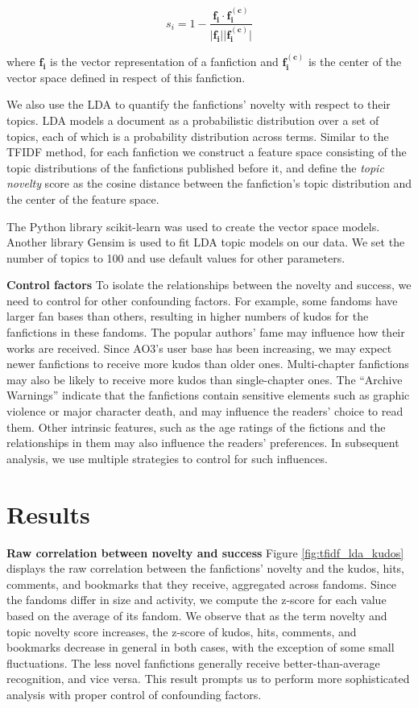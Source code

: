 \documentclass[letterpaper]{article} %
\begin{document}
\begin{equation}
s_i = 1-\frac{\boldsymbol{f_i} \cdot{\boldsymbol{f_i^{(c)}}}} {\lvert \boldsymbol{f_i} \rvert \lvert \boldsymbol{f_i^{(c)}} \rvert}
\end{equation}

where $\boldsymbol{f_i}$ is the vector representation of a fanfiction and $\boldsymbol{f_i^{(c)}}$ is the center of the vector space defined in respect of this fanfiction.

We also use the LDA to quantify the fanfictions' novelty with respect to their topics. LDA models a document as a probabilistic distribution over a set of topics, each of which is a probability distribution across terms. Similar to the TFIDF method, for each fanfiction we construct a feature space consisting of the topic distributions of the fanfictions published before it, and define the \emph{topic novelty} score as the cosine distance between the fanfiction's topic distribution and the center of the feature space. 

The Python library scikit-learn was used to create the vector space models. Another library Gensim is used to fit LDA topic models on our data. We set the number of topics to 100 and use default values for other parameters. 

\textbf{Control factors}    To isolate the relationships between the novelty and success, we need to control for other confounding factors. For example, some fandoms have larger fan bases than others, resulting in higher numbers of kudos for the fanfictions in these fandoms. The popular authors' fame may influence how their works are received. Since AO3's user base has been increasing, we may expect newer fanfictions to receive more kudos than older ones. Multi-chapter fanfictions may also be likely to receive more kudos than single-chapter ones. The ``Archive Warnings'' indicate that the fanfictions contain sensitive elements such as graphic violence or major character death, and may influence the readers' choice to read them. Other intrinsic features, such as the age ratings of the fictions and the relationships in them may also influence the readers' preferences. In subsequent analysis, we use multiple strategies to control for such influences.


\section{Results}

\textbf{Raw correlation between novelty and success}    Figure \ref{fig:tfidf_lda_kudos} displays the raw correlation between the fanfictions' novelty and the kudos, hits, comments, and bookmarks that they receive, aggregated across fandoms. Since the fandoms differ in size and activity, we compute the z-score for each value based on the average of its fandom. We observe that as the term novelty and topic novelty score increases, the z-score of kudos, hits, comments, and bookmarks decrease in general in both cases, with the exception of some small fluctuations. The less novel fanfictions generally receive better-than-average recognition, and vice versa. This result prompts us to perform more sophisticated analysis with proper control of confounding factors.
\end{document}

